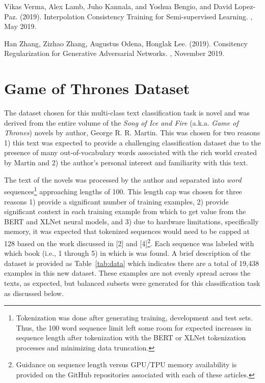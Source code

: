 \documentclass[twoside,twocolumn,10pt]{article}
\begin{document}
\begin{thebibliography}{99}
Vikas Verma, Alex Lamb, Juho Kannala, and Yoshua Bengio, and David Lopez-Paz. (2019).
\newblock Interpolation Consistency Training for Semi-supervised Learning.
, May 2019.

Han Zhang, Zizhao Zhang, Augustus Odena, Honglak Lee. (2019).
\newblock Consitency Regularization for Generative Adversarial Networks.
, November 2019.
 
\end{thebibliography}
\clearpage
\appendix
\onecolumn
\setcounter{table}{0}
\renewcommand{\thetable}{A\arabic{table}}
\renewcommand{\tableformat}{\tablename~\thetable}
\section{Game of Thrones Dataset} \label{data}
The dataset chosen for this multi-class text classification task is novel and was derived from the entire volume of the {\it Song of Ice and Fire} (a.k.a. {\it Game of Thrones}) novels by author, George R. R. Martin. This was chosen for two reasons 1) this text was expected to provide a challenging classification dataset due to the presence of many out-of-vocabulary words associated with the rich world created by Martin and 2) the author's personal interest and familiarity with this text.

The text of the novels was processed by the author and separated into {\it word} sequences\footnote{Tokenization was done after generating training, development and test sets. Thus, the 100 word sequence limit left some room for expected increases in sequence length after tokenization with the BERT or XLNet tokenization processes and minimizing data truncation.} approaching lengths of 100. This length cap was chosen for three reasons 1) provide a significant number of training examples, 2) provide significant context in each training example from which to get value from the BERT and XLNet neural models, and 3) due to hardware limitations, specifically memory, it was expected that tokenized sequences would need to be capped at 128 based on the work discussed in [2] and [4]\footnote{Guidance on sequence length versus GPU/TPU memory availability is provided on the GitHub repositories associated with each of these articles.}. Each sequence was labeled with which book (i.e., 1 through 5) in which is was found. A brief description of the dataset is provided as Table~\ref{tab:data} which indicates there are a total of 19,438 examples in this new dataset. These examples are not evenly spread across the texts, as expected, but balanced subsets were generated for this classification task as discussed below.
\end{document}
